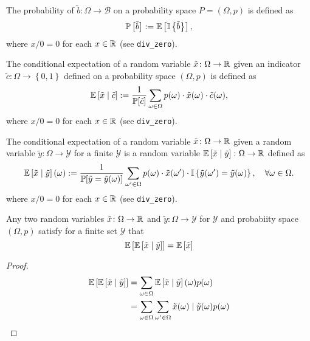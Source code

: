 \begin{definition}[Probability]
  The probability of $\tilde{b}\colon \Omega \to \mathcal{B}$ on a probability space $P = (\Omega, p)$ is defined as
  \[
    \mathbb{P} \left[ \tilde{b} \right] := \mathbb{E}\left[\mathbb{I}\left\{ \tilde{b} \right\}\right],
  \]
where $x / 0 = 0$ for each $x\in \mathbb{R}$ (see \texttt{div\_zero}).
\end{definition}

\begin{definition}
  The conditional expectation of a random variable $\tilde{x} \colon \Omega \to \mathbb{R}$ given an indicator $\tilde{c} \colon \Omega \to  \left\{ 0, 1  \right\}$ defined on a probability space $(\Omega, p)$ is defined as
  \[
    \mathbb{E} \left[ \tilde{x} \mid  \tilde{c} \right] := \frac{1}{\mathbb{P}[\tilde{c}]} \sum_{\omega \in \Omega } p(\omega ) \cdot \tilde{x}(\omega) \cdot \tilde{c}(\omega),
  \]
where $x / 0 = 0$ for each $x\in \mathbb{R}$ (see \texttt{div\_zero}).
  \leanok
\end{definition}

\begin{definition}
  The conditional expectation of a random variable $\tilde{x} \colon \Omega \to \mathbb{R}$ given a random variable $\tilde{y} \colon \Omega \to \mathcal{Y}$ for a finite $\mathcal{Y}$ is a random variable $\mathbb{E} \left[ \tilde{x} \mid  \tilde{y} \right]\colon \Omega \to \mathbb{R}$  defined as
  \[
    \mathbb{E} \left[ \tilde{x} \mid  \tilde{y} \right](\omega)
    :=
    \frac{1}{\mathbb{P}[\tilde{y} = \tilde{y}(\omega)]} \sum_{\omega' \in \Omega } p(\omega) \cdot \tilde{x}(\omega') \cdot \mathbb{I}\left\{ \tilde{y}(\omega') = \tilde{y}(\omega) \right\}, \quad \forall \omega \in \Omega.
  \]
where $x / 0 = 0$ for each $x\in \mathbb{R}$ (see \texttt{div\_zero}).
  \leanok
\end{definition}





\begin{theorem}
Any two random variables $\tilde{x} \colon \Omega \to \mathbb{R}$ and $\tilde{y} \colon \Omega \to \mathcal{Y} $ for $\mathcal{Y}$ and probabiity space $(\Omega, p)$ satisfy for a finite set $\mathcal{Y}$ that
  \[
   \mathbb{E}\left[\mathbb{E}\left[\tilde{x} \mid  \tilde{y}\right]\right] = \mathbb{E} \left[ \tilde{x} \right] 
 \]
\end{theorem}
\begin{proof}
  \begin{align*}
    \mathbb{E}\left[\mathbb{E}\left[\tilde{x} \mid  \tilde{y}\right]\right]
    &= \sum_{\omega \in \Omega } \mathbb{E}\left[\tilde{x} \mid  \tilde{y}\right](\omega) p(\omega)  \\
    &= \sum_{\omega \in \Omega } \sum_{\omega'\in \Omega} \tilde{x}(\omega) \mid  \tilde{y}(\omega) p(\omega)  \\
  \end{align*}
\end{proof}


